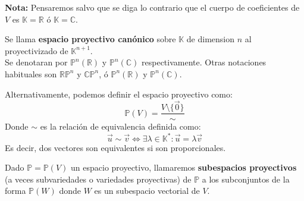 
\textbf{Nota:} Pensaremos salvo que se diga lo contrario que el cuerpo de coeficientes de $V$ es $\mathbb{K} = \mathbb{R}$ ó $\mathbb{K} = \mathbb{C}$.\\

\begin{definición}
Se llama \textbf{espacio proyectivo canónico} sobre $\mathbb{K}$ de dimension $n$ al proyectivizado de $\mathbb{K}^{n+1}$.\\
Se denotaran por $\mathbb{P}^n(\mathbb{R})$ y $\mathbb{P}^n(\mathbb{C})$ respectivamente. Otras notaciones habituales son $\mathbb{R}\mathbb{P}^n$ y $\mathbb{C}\mathbb{P}^n$, ó $\mathbb{P}^n(\mathbb{R})$ y $\mathbb{P}^n(\mathbb{C})$.
\end{definición}

Alternativamente, podemos definir el espacio proyectivo como:
$$ \mathbb{P}(V) = \frac{V \setminus \{\vec{0}\}}{\sim} $$
Donde $\sim$ es la relación de equivalencia definida como:
$$ \vec{u} \sim \vec{v} \iff \exists \lambda \in \mathbb{K}^* : \vec{u} = \lambda \vec{v} $$
Es decir, dos vectores son equivalentes si son proporcionales.\\

\begin{definición}
Dado $\mathbb{P} = \mathbb{P}(V)$ un espacio proyectivo, llamaremos \textbf{subespacios proyectivos} (a veces subvariedades o variedades proyectivas) de $\mathbb{P}$ a los subconjuntos de la forma $\mathbb{P}(W)$ donde $W$ es un subespacio vectorial de $V$.
\end{definición}

